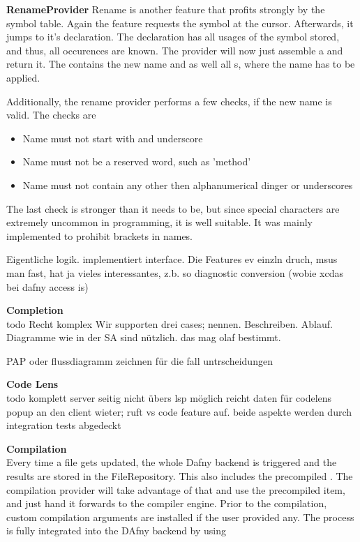 \textbf{RenameProvider}
Rename is another feature that profits strongly by the symbol table. Again the feature requests the symbol at the cursor. Afterwards, it jumps to it's declaration. The declaration has all usages of the symbol stored, and thus, all occurences are known. The provider will now just assemble a  and return it. The  contains the new name and as well all s, where the name has to be applied.

Additionally, the rename provider performs a few checks, if the new name is valid. The checks are
\begin{itemize}
    \item Name must not start with and underscore
    \item Name must not be a reserved word, such as 'method'
    \item Name must not contain any other then alphanumerical dinger or underscores
\end{itemize}

The last check is stronger than it needs to be, but since special characters are extremely uncommon in programming, it is well suitable. It was mainly implemented to prohibit brackets in names.


Eigentliche logik. implementiert interface. Die Features ev einzln druch, msus man fast, hat ja vieles interessantes, z.b. so diagnostic conversion (wobie xcdas bei dafny access is)

\textbf{Completion}\\
todo
Recht komplex
Wir supporten drei cases; nennen. Beschreiben.
Ablauf. Diagramme wie in der SA sind nützlich. das mag olaf bestimmt. 

PAP oder flussdiagramm zeichnen für die fall untrscheidungen

\textbf{Code Lens}\\
todo
komplett server seitig nicht übers lsp möglich
reicht daten für codelens popup an den client wieter; ruft vs code feature auf.
beide aspekte werden durch integration tests abgedeckt

\textbf{Compilation}\\
Every time a file gets updated, the whole Dafny backend is triggered and the results are stored in the FileRepository. This also includes the precompiled . The compilation provider will take advantage of that and use the precompiled item, and just hand it forwards to the compiler engine. Prior to the compilation, custom compilation arguments are installed if the user provided any. The process is fully integrated into the DAfny backend by using

